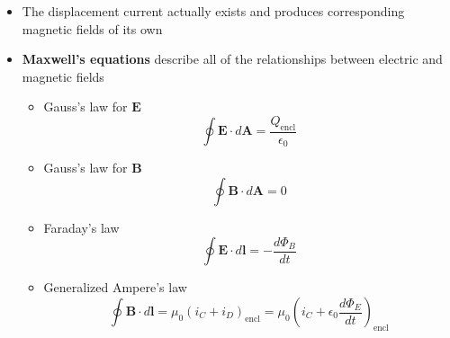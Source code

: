 \documentclass{article}
\begin{document}
\begin{itemize}
  \item The displacement current actually exists and produces corresponding magnetic fields of its own

  \item \textbf{Maxwell's equations} describe all of the relationships between electric and magnetic fields

        \begin{itemize}
          \item Gauss's law for $\mathbf{E}$ \[\oint \mathbf{E} \cdot d \mathbf{A} = \frac{Q_\text{encl}}{\epsilon_0}\]

          \item Gauss's law for $\mathbf{B}$ \[\oint \mathbf{B} \cdot d \mathbf{A} = 0\]

          \item Faraday's law \[\oint \mathbf{E} \cdot d \mathbf{l} = -\frac{d \Phi_B}{dt}\]

          \item Generalized Ampere's law \[\oint \mathbf{B} \cdot d \mathbf{l} = \mu_0 (i_C + i_D)_\text{encl} = \mu_0 (i_C + \epsilon_0 \frac{d \Phi_E}{dt})_\text{encl}\]
        \end{itemize}
\end{itemize}
\end{document}
